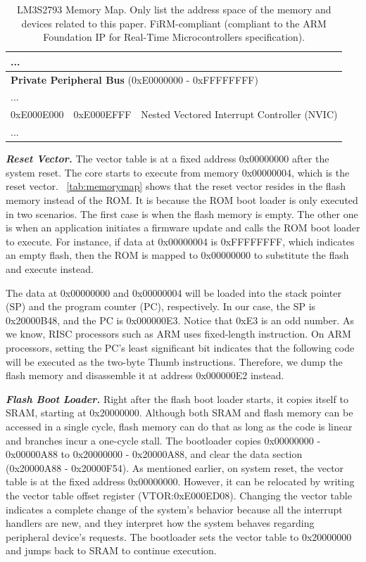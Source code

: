 \begin{center}
\begin{table}
\begin{tabular}{p{1.6cm}  p{1.6cm}  p{4cm}}
			... & & \\
			\hline
			\multicolumn{3}{l}{\textbf{Private Peripheral Bus} (0xE0000000 - 0xFFFFFFFF)}  \\
			\hline
			... & & \\
			\hline
			0xE000E000 & 0xE000EFFF & Nested Vectored Interrupt Controller (NVIC) \\
			\hline
			... & & \\
			\hline
		\end{tabular}
		\caption{LM3S2793 Memory Map. Only list the address space of the memory and devices related to this paper. FiRM-compliant (compliant to the ARM Foundation IP for Real-Time Microcontrollers specification).}
		\label{tab:memorymap}
	\end{table}
\end{center}


\textbf{\textit{Reset Vector.}} The vector table is at a fixed address 0x00000000 after the system reset. The core starts to execute from memory 0x00000004, which is the reset vector. ~\autoref{tab:memorymap} shows that the reset vector resides in the flash memory instead of the ROM. It is because the ROM boot loader is only executed in two scenarios. The first case is when the flash memory is empty. The other one is when an application initiates a firmware update and calls the ROM boot loader to execute. For instance, if data at 0x00000004 is 0xFFFFFFFF, which indicates an empty flash, then the ROM is mapped to 0x00000000 to substitute the flash and execute instead. 

The data at 0x00000000 and 0x00000004 will be loaded into the stack pointer (SP) and the program counter (PC), respectively. In our case, the SP is 0x20000B48, and the PC is 0x000000E3. Notice that 0xE3 is an odd number. As we know, RISC processors such as ARM uses fixed-length instruction. On ARM processors, setting the PC's least significant bit indicates that the following code will be executed as the two-byte Thumb instructions. Therefore, we dump the flash memory and disassemble it at address 0x000000E2 instead.



\textbf{\textit{Flash Boot Loader.}} Right after the flash boot loader starts, it copies itself to SRAM, starting at 0x20000000. Although both SRAM and flash memory can be accessed in a single cycle, flash memory can do that as long as the code is linear and branches incur a one-cycle stall. The bootloader copies 0x00000000 - 0x00000A88 to 0x20000000 - 0x20000A88, and clear the data section (0x20000A88 - 0x20000F54). As mentioned earlier, on system reset, the vector table is at the fixed address 0x00000000. However, it can be relocated by writing the vector table offset register (VTOR:0xE000ED08). Changing the vector table indicates a complete change of the system's behavior because all the interrupt handlers are new, and they interpret how the system behaves regarding peripheral device's requests. The bootloader sets the vector table to 0x20000000 and jumps back to SRAM to continue execution.


